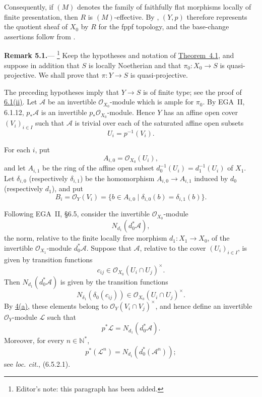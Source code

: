 
Consequently, if \((M)\) denotes the family of faithfully flat
morphisms locally of finite presentation, then \(R\) is
\((M)\)-effective. By , \((Y,p)\) therefore
represents the quotient sheaf of \(X_0\) by \(R\) for the fppf
topology, and the base-change assertions follow from .

\medskip
{}\label{rem:sga3-V-5.1}%
\noindent\textbf{Remark 5.1.}---%
\footnote{\label{note:sga3-V-30}Editor's note: this paragraph has been added.}
Keep the hypotheses and notation of \hyperref[thm:sga3-V-4.1]{Theorem~4.1}, and suppose in
addition that \(S\) is locally Noetherian and that
\(\pi_0:X_0\to S\) is quasi-projective. We shall prove that
\(\pi:Y\to S\) is quasi-projective.

The preceding hypotheses imply that \(Y\to S\) is of finite type; see
the proof of \hyperref[lem:sga3-V-6.1-ii]{6.1(ii)}. Let \(\mathscr A\) be an invertible
\(\mathcal O_{X_0}\)-module which is ample for \(\pi_0\). By EGA~II,
6.1.12, \(p_\ast\mathscr A\) is an invertible
\(p_\ast\mathcal O_{X_0}\)-module. Hence \(Y\) has an affine open
cover \((V_i)_{i\in I}\) such that \(\mathscr A\) is trivial over each
of the saturated affine open subsets
\[
  U_i=p^{-1}(V_i).
\]

For each \(i\), put
\[
  A_{i,0}=\mathcal O_{X_0}(U_i),
\]
and let \(A_{i,1}\) be the ring of the affine open subset
\(d_0^{-1}(U_i)=d_1^{-1}(U_i)\) of \(X_1\). Let
\(\delta_{i,0}\) (respectively \(\delta_{i,1}\)) be the homomorphism
\(A_{i,0}\to A_{i,1}\) induced by \(d_0\) (respectively \(d_1\)), and
put
\[
  B_i=\mathcal O_Y(V_i)
  =\{b\in A_{i,0}\mid\delta_{i,0}(b)=\delta_{i,1}(b)\}.
\]

Following EGA~II, \S6.5, consider the invertible
\(\mathcal O_{X_0}\)-module
\[
  N_{d_1}\!\left(d_0^\ast\mathscr A\right),
\]
the norm, relative to the finite locally free morphism
\(d_1:X_1\to X_0\), of the invertible
\(\mathcal O_{X_1}\)-module \(d_0^\ast\mathscr A\). Suppose that
\(\mathscr A\), relative to the cover \((U_i)_{i\in I}\), is given by
transition functions
\[
  c_{ij}\in\mathcal O_{X_0}(U_i\cap U_j)^\times.
\]
Then \(N_{d_1}(d_0^\ast\mathscr A)\) is given by the transition
functions
\[
  N_{\delta_1}(\delta_0(c_{ij}))
  \in\mathcal O_{X_0}(U_i\cap U_j)^\times.
\]
By \hyperref[proof:sga3-V-4.1-a]{4(a)}, these elements belong to
\(\mathcal O_Y(V_i\cap V_j)^\times\), and hence define an invertible
\(\mathcal O_Y\)-module \(\mathscr L\) such that
\[
  p^\ast\mathscr L=N_{d_1}(d_0^\ast\mathscr A).
\]
Moreover, for every \(n\in\mathbb N^\ast\),
\[
  p^\ast(\mathscr L^n)
  =N_{d_1}\!\left(d_0^\ast(\mathscr A^n)\right);
\]
see \emph{loc. cit.}, (6.5.2.1).

